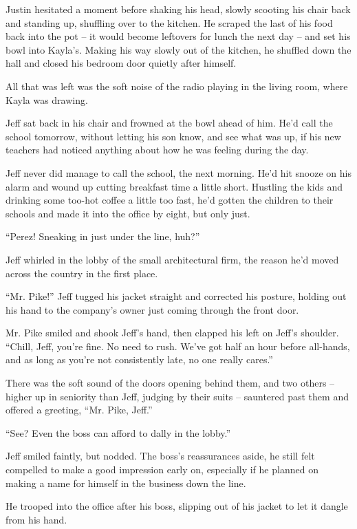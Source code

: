 Justin hesitated a moment before shaking his head, slowly scooting his chair back and standing up, shuffling over to the kitchen.  He scraped the last of his food back into the pot -- it would become leftovers for lunch the next day -- and set his bowl into Kayla's.  Making his way slowly out of the kitchen, he shuffled down the hall and closed his bedroom door quietly after himself.

All that was left was the soft noise of the radio playing in the living room, where Kayla was drawing.

Jeff sat back in his chair and frowned at the bowl ahead of him.  He'd call the school tomorrow, without letting his son know, and see what was up, if his new teachers had noticed anything about how he was feeling during the day.

\secdiv

Jeff never did manage to call the school, the next morning.  He'd hit snooze on his alarm and wound up cutting breakfast time a little short.  Hustling the kids and drinking some too-hot coffee a little too fast, he'd gotten the children to their schools and made it into the office by eight, but only just.

``Perez!  Sneaking in just under the line, huh?''

Jeff whirled in the lobby of the small architectural firm, the reason he'd moved across the country in the first place.

``Mr. Pike!''  Jeff tugged his jacket straight and corrected his posture, holding out his hand to the company's owner just coming through the front door.

Mr. Pike smiled and shook Jeff's hand, then clapped his left on Jeff's shoulder.  ``Chill, Jeff, you're fine.  No need to rush.  We've got half an hour before all-hands, and as long as you're not consistently late, no one really cares.''

There was the soft sound of the doors opening behind them, and two others -- higher up in seniority than Jeff, judging by their suits -- sauntered past them and offered a greeting, ``Mr. Pike, Jeff.''

``See?  Even the boss can afford to dally in the lobby.''

Jeff smiled faintly, but nodded.  The boss's reassurances aside, he still felt compelled to make a good impression early on, especially if he planned on making a name for himself in the business down the line.

He trooped into the office after his boss, slipping out of his jacket to let it dangle from his hand.
